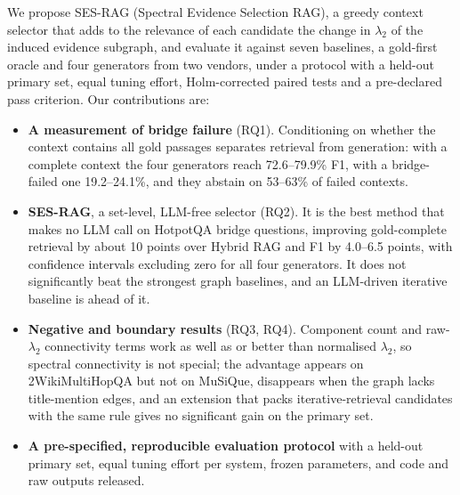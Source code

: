 We propose SES-RAG (Spectral Evidence Selection RAG), a greedy context selector that adds to the relevance of each candidate the change in $\lambda_2$ of the induced evidence subgraph, and evaluate it against seven baselines, a gold-first oracle and four generators from two vendors, under a protocol with a held-out primary set, equal tuning effort, Holm-corrected paired tests and a pre-declared pass criterion. Our contributions are:
\begin{itemize}
\item \textbf{A measurement of bridge failure} (RQ1). Conditioning on whether the context contains all gold passages separates retrieval from generation: with a complete context the four generators reach 72.6--79.9\% F1, with a bridge-failed one 19.2--24.1\%, and they abstain on 53--63\% of failed contexts.
\item \textbf{SES-RAG}, a set-level, LLM-free selector (RQ2). It is the best method that makes no LLM call on HotpotQA bridge questions, improving gold-complete retrieval by about 10 points over Hybrid RAG and F1 by 4.0--6.5 points, with confidence intervals excluding zero for all four generators. It does not significantly beat the strongest graph baselines, and an LLM-driven iterative baseline is ahead of it.
\item \textbf{Negative and boundary results} (RQ3, RQ4). Component count and raw-$\lambda_2$ connectivity terms work as well as or better than normalised $\lambda_2$, so spectral connectivity is not special; the advantage appears on 2WikiMultiHopQA but not on MuSiQue, disappears when the graph lacks title-mention edges, and an extension that packs iterative-retrieval candidates with the same rule gives no significant gain on the primary set.
\item \textbf{A pre-specified, reproducible evaluation protocol} with a held-out primary set, equal tuning effort per system, frozen parameters, and code and raw outputs released.
\end{itemize}
